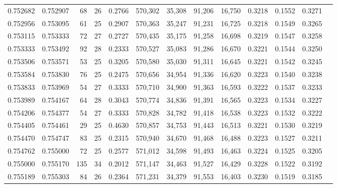 \begin{tabular}{rrrrrrrrrrrrr}
0.752682 & 0.752907 &     68 &    26 &                                     0.2766 & 570,302 &  35,308 &  91,206 &  16,750 & 0.3218 & 0.1552 & 0.3271 \\
0.752956 & 0.753095 &     61 &    25 &                                     0.2907 & 570,363 &  35,247 &  91,231 &  16,725 & 0.3218 & 0.1549 & 0.3265 \\
0.753115 & 0.753333 &     72 &    27 &                                     0.2727 & 570,435 &  35,175 &  91,258 &  16,698 & 0.3219 & 0.1547 & 0.3258 \\
0.753333 & 0.753492 &     92 &    28 &                                     0.2333 & 570,527 &  35,083 &  91,286 &  16,670 & 0.3221 & 0.1544 & 0.3250 \\
0.753506 & 0.753571 &     53 &    25 &                                     0.3205 & 570,580 &  35,030 &  91,311 &  16,645 & 0.3221 & 0.1542 & 0.3245 \\
0.753584 & 0.753830 &     76 &    25 &                                     0.2475 & 570,656 &  34,954 &  91,336 &  16,620 & 0.3223 & 0.1540 & 0.3238 \\
0.753833 & 0.753969 &     54 &    27 &                                     0.3333 & 570,710 &  34,900 &  91,363 &  16,593 & 0.3222 & 0.1537 & 0.3233 \\
0.753989 & 0.754167 &     64 &    28 &                                     0.3043 & 570,774 &  34,836 &  91,391 &  16,565 & 0.3223 & 0.1534 & 0.3227 \\
0.754206 & 0.754377 &     54 &    27 &                                     0.3333 & 570,828 &  34,782 &  91,418 &  16,538 & 0.3223 & 0.1532 & 0.3222 \\
0.754405 & 0.754461 &     29 &    25 &                                     0.4630 & 570,857 &  34,753 &  91,443 &  16,513 & 0.3221 & 0.1530 & 0.3219 \\
0.754470 & 0.754747 &     83 &    25 &                                     0.2315 & 570,940 &  34,670 &  91,468 &  16,488 & 0.3223 & 0.1527 & 0.3211 \\
0.754762 & 0.755000 &     72 &    25 &                                     0.2577 & 571,012 &  34,598 &  91,493 &  16,463 & 0.3224 & 0.1525 & 0.3205 \\
0.755000 & 0.755170 &    135 &    34 &                                     0.2012 & 571,147 &  34,463 &  91,527 &  16,429 & 0.3228 & 0.1522 & 0.3192 \\
0.755189 & 0.755303 &     84 &    26 &                                     0.2364 & 571,231 &  34,379 &  91,553 &  16,403 & 0.3230 & 0.1519 & 0.3185 \\

\end{tabular}
